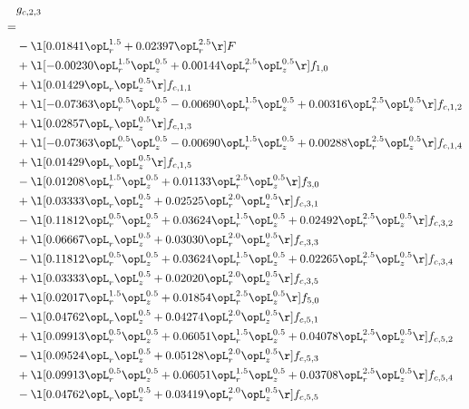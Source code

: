 \begin{alignat}{2} 
\label{eq:g_23_0} 
& g_{c,2,3} \nonumber \\ 
 = \\ 
& - \l[  0.01841 \opL_r^{1.5} +  0.02397 \opL_r^{2.5}  \r] F \nonumber \\ 
& + \l[  -0.00230 \opL_r^{1.5} \opL_z^{0.5} +  0.00144 \opL_r^{2.5} \opL_z^{0.5}  \r] f_{1,0} \nonumber \\ 
& + \l[  0.01429 \opL_r \opL_z^{0.5}  \r] f_{c,1,1} \nonumber \\ 
& + \l[  -0.07363 \opL_r^{0.5} \opL_z^{0.5}   -0.00690 \opL_r^{1.5} \opL_z^{0.5} +  0.00316 \opL_r^{2.5} \opL_z^{0.5}  \r] f_{c,1,2} \nonumber \\ 
& + \l[  0.02857 \opL_r \opL_z^{0.5}  \r] f_{c,1,3} \nonumber \\ 
& + \l[  -0.07363 \opL_r^{0.5} \opL_z^{0.5}   -0.00690 \opL_r^{1.5} \opL_z^{0.5} +  0.00288 \opL_r^{2.5} \opL_z^{0.5}  \r] f_{c,1,4} \nonumber \\ 
& + \l[  0.01429 \opL_r \opL_z^{0.5}  \r] f_{c,1,5} \nonumber \\ 
& - \l[  0.01208 \opL_r^{1.5} \opL_z^{0.5} +  0.01133 \opL_r^{2.5} \opL_z^{0.5}  \r] f_{3,0} \nonumber \\ 
& + \l[  0.03333 \opL_r \opL_z^{0.5} +  0.02525 \opL_r^{2.0} \opL_z^{0.5}  \r] f_{c,3,1} \nonumber \\ 
& - \l[  0.11812 \opL_r^{0.5} \opL_z^{0.5} +  0.03624 \opL_r^{1.5} \opL_z^{0.5} +  0.02492 \opL_r^{2.5} \opL_z^{0.5}  \r] f_{c,3,2} \nonumber \\ 
& + \l[  0.06667 \opL_r \opL_z^{0.5} +  0.03030 \opL_r^{2.0} \opL_z^{0.5}  \r] f_{c,3,3} \nonumber \\ 
& - \l[  0.11812 \opL_r^{0.5} \opL_z^{0.5} +  0.03624 \opL_r^{1.5} \opL_z^{0.5} +  0.02265 \opL_r^{2.5} \opL_z^{0.5}  \r] f_{c,3,4} \nonumber \\ 
& + \l[  0.03333 \opL_r \opL_z^{0.5} +  0.02020 \opL_r^{2.0} \opL_z^{0.5}  \r] f_{c,3,5} \nonumber \\ 
& + \l[  0.02017 \opL_r^{1.5} \opL_z^{0.5} +  0.01854 \opL_r^{2.5} \opL_z^{0.5}  \r] f_{5,0} \nonumber \\ 
& - \l[  0.04762 \opL_r \opL_z^{0.5} +  0.04274 \opL_r^{2.0} \opL_z^{0.5}  \r] f_{c,5,1} \nonumber \\ 
& + \l[  0.09913 \opL_r^{0.5} \opL_z^{0.5} +  0.06051 \opL_r^{1.5} \opL_z^{0.5} +  0.04078 \opL_r^{2.5} \opL_z^{0.5}  \r] f_{c,5,2} \nonumber \\ 
& - \l[  0.09524 \opL_r \opL_z^{0.5} +  0.05128 \opL_r^{2.0} \opL_z^{0.5}  \r] f_{c,5,3} \nonumber \\ 
& + \l[  0.09913 \opL_r^{0.5} \opL_z^{0.5} +  0.06051 \opL_r^{1.5} \opL_z^{0.5} +  0.03708 \opL_r^{2.5} \opL_z^{0.5}  \r] f_{c,5,4} \nonumber \\ 
& - \l[  0.04762 \opL_r \opL_z^{0.5} +  0.03419 \opL_r^{2.0} \opL_z^{0.5}  \r] f_{c,5,5} \nonumber \\ 
\end{alignat} 


